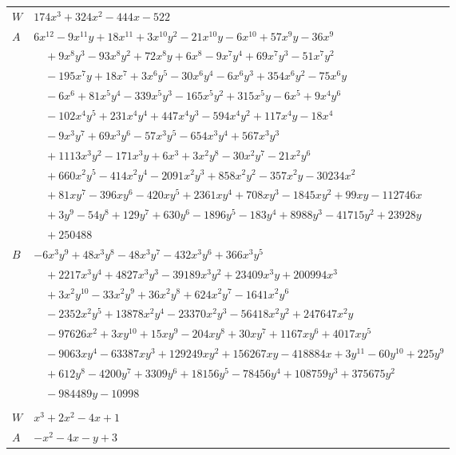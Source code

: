\documentclass[11pt]{article}
\begin{document}
\begin{longtable}{@{}ll@{}}
$W$ & $174x^{3}+324x^{2}-444x-522$\\
$A$ & $6x^{12}-9x^{11}y+18x^{11}+3x^{10}y^{2}-21x^{10}y-6x^{10}+57x^{9}y-36x^{9}$\\
 & $\quad +9x^{8}y^{3}-93x^{8}y^{2}+72x^{8}y+6x^{8}-9x^{7}y^{4}+69x^{7}y^{3}-51x^{7}y^{2}$\\
 & $\quad -195x^{7}y+18x^{7}+3x^{6}y^{5}-30x^{6}y^{4}-6x^{6}y^{3}+354x^{6}y^{2}-75x^{6}y$\\
 & $\quad -6x^{6}+81x^{5}y^{4}-339x^{5}y^{3}-165x^{5}y^{2}+315x^{5}y-6x^{5}+9x^{4}y^{6}$\\
 & $\quad -102x^{4}y^{5}+231x^{4}y^{4}+447x^{4}y^{3}-594x^{4}y^{2}+117x^{4}y-18x^{4}$\\
 & $\quad -9x^{3}y^{7}+69x^{3}y^{6}-57x^{3}y^{5}-654x^{3}y^{4}+567x^{3}y^{3}$\\
 & $\quad +1113x^{3}y^{2}-171x^{3}y+6x^{3}+3x^{2}y^{8}-30x^{2}y^{7}-21x^{2}y^{6}$\\
 & $\quad +660x^{2}y^{5}-414x^{2}y^{4}-2091x^{2}y^{3}+858x^{2}y^{2}-357x^{2}y-30234x^{2}$\\
 & $\quad +81xy^{7}-396xy^{6}-420xy^{5}+2361xy^{4}+708xy^{3}-1845xy^{2}+99xy-112746x$\\
 & $\quad +3y^{9}-54y^{8}+129y^{7}+630y^{6}-1896y^{5}-183y^{4}+8988y^{3}-41715y^{2}+23928y$\\
 & $\quad +250488$\\
$B$ & $-6x^{3}y^{9}+48x^{3}y^{8}-48x^{3}y^{7}-432x^{3}y^{6}+366x^{3}y^{5}$\\
 & $\quad +2217x^{3}y^{4}+4827x^{3}y^{3}-39189x^{3}y^{2}+23409x^{3}y+200994x^{3}$\\
 & $\quad +3x^{2}y^{10}-33x^{2}y^{9}+36x^{2}y^{8}+624x^{2}y^{7}-1641x^{2}y^{6}$\\
 & $\quad -2352x^{2}y^{5}+13878x^{2}y^{4}-23370x^{2}y^{3}-56418x^{2}y^{2}+247647x^{2}y$\\
 & $\quad -97626x^{2}+3xy^{10}+15xy^{9}-204xy^{8}+30xy^{7}+1167xy^{6}+4017xy^{5}$\\
 & $\quad -9063xy^{4}-63387xy^{3}+129249xy^{2}+156267xy-418884x+3y^{11}-60y^{10}+225y^{9}$\\
 & $\quad +612y^{8}-4200y^{7}+3309y^{6}+18156y^{5}-78456y^{4}+108759y^{3}+375675y^{2}$\\
 & $\quad -984489y-10998$\\
\addlinespace[3pt]
\multicolumn{2}{@{}l}{$i=16$, $m=2$, neighbours $42,10,36$}\\
$W$ & $x^{3}+2x^{2}-4x+1$\\
$A$ & $-x^{2}-4x-y+3$\\

\end{longtable}
\end{document}
